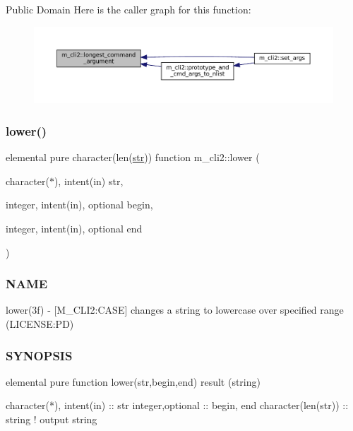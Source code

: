 Public Domain Here is the caller graph for this function\+:
\nopagebreak
\begin{figure}[H]
\begin{center}
\leavevmode
\includegraphics[width=350pt]{namespacem__cli2_a7240f12031027172b87fde623bd77958_icgraph}
\end{center}
\end{figure}
\mbox{\label{namespacem__cli2_a6d2d93ab8471667e632bf7a0e95ebd13}} 
\subsubsection{\texorpdfstring{lower()}{lower()}}
{\footnotesize\ttfamily elemental pure character(len(\mbox{\hyperlink{interfacem__cli2_1_1str}{str}})) function m\+\_\+cli2\+::lower (\begin{DoxyParamCaption}\item[{character($\ast$), intent(in)}]{str,  }\item[{integer, intent(in), optional}]{begin,  }\item[{integer, intent(in), optional}]{end }\end{DoxyParamCaption})\hspace{0.3cm}{\ttfamily [private]}}



\subsubsection*{N\+A\+ME}

lower(3f) -\/ \mbox{[}M\+\_\+\+C\+L\+I2\+:C\+A\+SE\mbox{]} changes a string to lowercase over specified range (L\+I\+C\+E\+N\+SE\+:PD) 

\subsubsection*{S\+Y\+N\+O\+P\+S\+IS}

\begin{DoxyVerb}elemental pure function lower(str,begin,end) result (string)

 character(*), intent(in) :: str
 integer,optional         :: begin, end
 character(len(str))      :: string  ! output string
\end{DoxyVerb}
